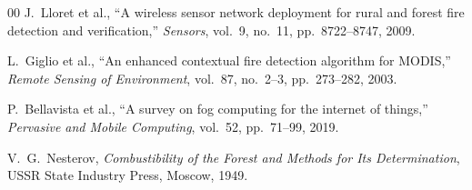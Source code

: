 \documentclass[conference]{IEEEtran}
\begin{document}
\begin{thebibliography}{00}
J.~Lloret et al.,
``A wireless sensor network deployment for rural and forest fire
detection and verification,''
\textit{Sensors}, vol.~9, no.~11, pp.~8722--8747, 2009.

L.~Giglio et al.,
``An enhanced contextual fire detection algorithm for MODIS,''
\textit{Remote Sensing of Environment}, vol.~87, no.~2--3,
pp.~273--282, 2003.

P.~Bellavista et al.,
``A survey on fog computing for the internet of things,''
\textit{Pervasive and Mobile Computing}, vol.~52, pp.~71--99, 2019.

V.~G.~Nesterov,
\textit{Combustibility of the Forest and Methods for Its
Determination}, USSR State Industry Press, Moscow, 1949.

\end{thebibliography}
\end{document}
